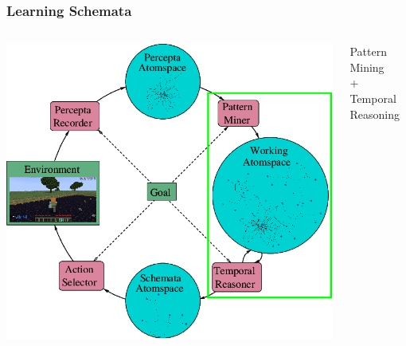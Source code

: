 \documentclass[aspectratio=169]{beamer}
\begin{document}
\begin{frame}
  \frametitle{Learning Schemata}


  \begin{columns}
    \column{3.2in}
    \includegraphics[scale=0.3]{pictures/rocca-chart-learning-highlight-v0.7.png}
    \column{2.5in}
    \begin{center}
      Pattern Mining\\
      +\\
      Temporal Reasoning
    \end{center}
  \end{columns}

\end{frame}
\end{document}
